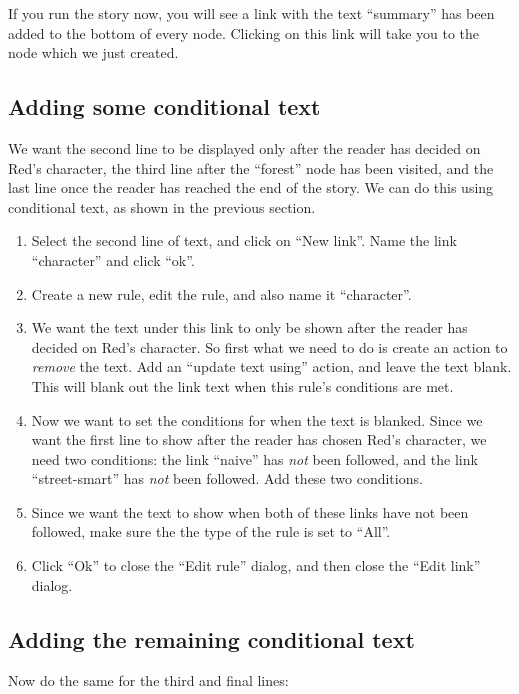 \documentclass{article}
\begin{document}
If you run the story now, you will see a link with the text ``summary'' has
been added to the bottom of every node. Clicking on this link will take you to
the node which we just created.

\subsection{Adding some conditional text}
We want the second line to be displayed only after the reader has decided on
Red's character, the third line after the ``forest'' node has been visited, and
the last line once the reader has reached the end of the story. We can do this
using conditional text, as shown in the previous section.

\begin{enumerate}
  \item Select the second line of text, and click on ``New link''. Name the link
  ``character'' and click ``ok''.
  \item Create a new rule, edit the rule, and also name it ``character''.
  \item We want the text under this link to only be shown after the reader has
  decided on Red's character. So first what we need to do is create an action
  to \textit{remove} the text. Add an ``update text using'' action, and leave
  the text blank. This will blank out the link text when this rule's conditions
  are met.
  
  \item Now we want to set the conditions for when the text is blanked. Since we
  want the first line to show after the reader has chosen Red's character, we
  need two conditions: the link ``naive'' has \textit{not} been followed,
  and the link ``street-smart'' has \textit{not} been followed. Add these two
  conditions.
  \item Since we want the text to show when both of these links have not been
  followed, make sure the the type of the rule is set to ``All''.
\item Click ``Ok'' to close the ``Edit rule'' dialog, and then close the ``Edit
link'' dialog.
\end{enumerate}

\subsection{Adding the remaining conditional text}
Now do the same for the third and final lines:
\end{document}
